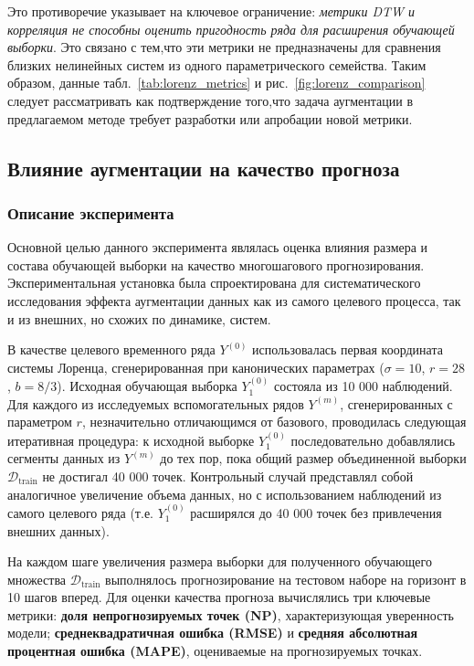 Это противоречие указывает на ключевое ограничение: \textit{метрики DTW и корреляция не
 способны оценить пригодность ряда для расширения обучающей выборки}. 
Это связано с тем,что эти метрики не предназначены для сравнения 
близких нелинейных систем из одного параметрического семейства.
Таким образом, данные табл.~\ref{tab:lorenz_metrics} и рис.~\ref{fig:lorenz_comparison} 
следует рассматривать как подтверждение того,что задача аугментации в предлагаемом методе 
требует разработки или апробации новой метрики.

\subsection{Влияние аугментации на качество прогноза}
\subsubsection{Описание эксперимента}
Основной целью данного эксперимента являлась оценка влияния размера и
состава обучающей выборки на качество многошагового прогнозирования. Экспериментальная
 установка была спроектирована для систематического исследования эффекта аугментации данных
  как из самого целевого процесса, так и из внешних, но схожих по динамике, систем.

В качестве целевого временного ряда $Y^{(0)}$ использовалась первая координата
 системы Лоренца, сгенерированная при канонических параметрах ($\sigma = 10$, $r = 28$, $b = 8/3$).
 Исходная обучающая выборка $Y_1^{(0)}$ состояла из 10 000 наблюдений. Для каждого из исследуемых
  вспомогательных рядов $Y^{(m)}$, сгенерированных с параметром $r$, незначительно отличающимся от
   базового, проводилась следующая итеративная процедура: к исходной выборке $Y_1^{(0)}$
   последовательно добавлялись сегменты данных из $Y^{(m)}$ до тех пор, пока общий размер
   объединенной выборки $\mathcal{D}_{\text{train}}$ не достигал 40 000 точек. Контрольный
   случай представлял собой аналогичное увеличение объема данных, но с использованием наблюдений
    из самого целевого ряда (т.е. $Y_1^{(0)}$ расширялся до 40 000 точек без привлечения внешних данных).

На каждом шаге увеличения размера выборки для полученного обучающего
 множества $\mathcal{D}_{\text{train}}$ выполнялось прогнозирование
 на тестовом наборе на горизонт в 10 шагов вперед. Для оценки качества прогноза 
 вычислялись три ключевые метрики: \textbf{доля непрогнозируемых точек (NP)},
  характеризующая уверенность модели; \textbf{среднеквадратичная ошибка (RMSE)}
   и \textbf{средняя абсолютная процентная ошибка (MAPE)}, оцениваемые на прогнозируемых точках.

